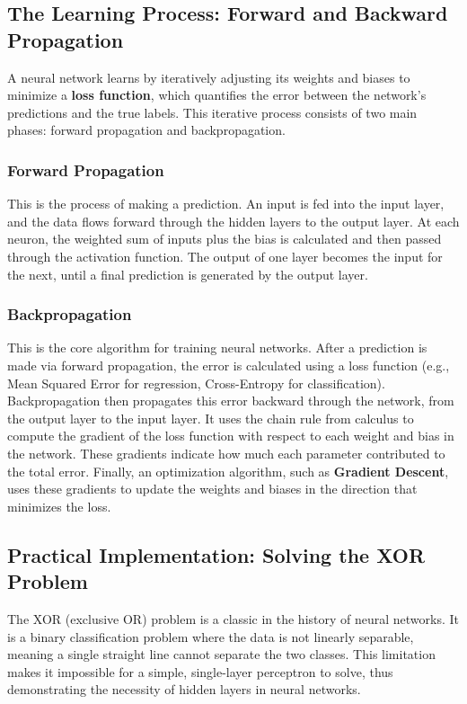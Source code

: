 \documentclass[11pt,a4paper]{article}
\begin{document}
\subsection{The Learning Process: Forward and Backward Propagation}

A neural network learns by iteratively adjusting its weights and biases to minimize a \textbf{loss function}, which quantifies the error between the network's predictions and the true labels. This iterative process consists of two main phases: forward propagation and backpropagation.

\subsubsection{Forward Propagation}

This is the process of making a prediction. An input is fed into the input layer, and the data flows forward through the hidden layers to the output layer. At each neuron, the weighted sum of inputs plus the bias is calculated and then passed through the activation function. The output of one layer becomes the input for the next, until a final prediction is generated by the output layer.

\subsubsection{Backpropagation}

This is the core algorithm for training neural networks. After a prediction is made via forward propagation, the error is calculated using a loss function (e.g., Mean Squared Error for regression, Cross-Entropy for classification). Backpropagation then propagates this error backward through the network, from the output layer to the input layer. It uses the chain rule from calculus to compute the gradient of the loss function with respect to each weight and bias in the network. These gradients indicate how much each parameter contributed to the total error. Finally, an optimization algorithm, such as \textbf{Gradient Descent}, uses these gradients to update the weights and biases in the direction that minimizes the loss.

\subsection{Practical Implementation: Solving the XOR Problem}

The XOR (exclusive OR) problem is a classic in the history of neural networks. It is a binary classification problem where the data is not linearly separable, meaning a single straight line cannot separate the two classes. This limitation makes it impossible for a simple, single-layer perceptron to solve, thus demonstrating the necessity of hidden layers in neural networks.
\end{document}
